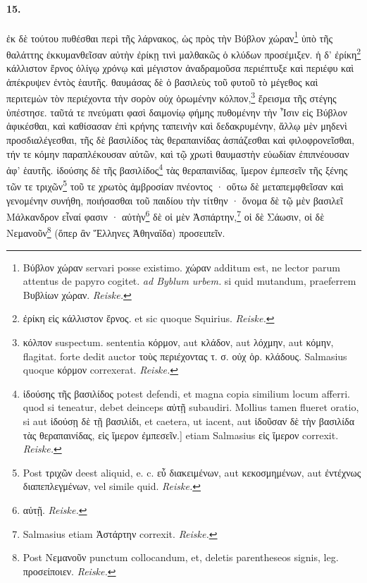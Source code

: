 \documentclass[a4paper, 11pt, oneside, polutonikogreek, german]{article}
\begin{document}
\paragraph{15.}
ἐκ δὲ τούτου πυθέσθαι περὶ τῆς λάρνακος, ὡς πρὸς τὴν Βύβλον χώραν\footnote{Βύβλον χώραν servari posse existimo. χώραν additum est, ne lector parum attentus de papyro cogitet. \emph{ad Byblum urbem.} si quid mutandum, praeferrem Βυβλίων χώραν. \emph{Reiske.}} ὑπὸ τῆς θαλάττης ἐκκυμανθεῖσαν αὐτὴν ἐρίκῃ τινὶ μαλθακῶς ὁ κλύδων προσέμιξεν. ἡ δ' ἐρίκη\footnote{ἐρίκη εἰς κάλλιστον ἔρνος. et sic quoque Squirius. \emph{Reiske.}} κάλλιστον ἔρνος ὀλίγῳ χρόνῳ καὶ μέγιστον ἀναδραμοῦσα περιέπτυξε καὶ περιέφυ καὶ ἀπέκρυψεν ἐντὸς ἑαυτῆς. θαυμάσας δὲ ὁ βασιλεὺς τοῦ φυτοῦ τὸ μέγεθος καὶ περιτεμὼν τὸν περιέχοντα τὴν σορὸν οὐχ ὁρωμένην κόλπον,\footnote{κόλπον suspectum. sententia κόρμον, aut κλάδον, aut λόχμην, aut κόμην, flagitat. forte dedit auctor τοὺς περιέχοντας τ. σ. οὐχ ὁρ. κλάδους. Salmasius quoque κόρμον correxerat. \emph{Reiske.}} ἔρεισμα τῆς στέγης ὑπέστησε. ταῦτά τε πνεύματι φασὶ δαιμονίῳ φήμης πυθομένην τὴν Ἶσιν εἰς Βύβλον ἀφικέσθαι, καὶ καθίσασαν ἐπὶ κρήνης ταπεινὴν καὶ δεδακρυμένην, ἄλλῳ μὲν μηδενὶ προσδιαλέγεσθαι, τῆς δὲ βασιλίδος τὰς θεραπαινίδας ἀσπάζεσθαι καὶ φιλοφρονεῖσθαι, τήν τε κόμην παραπλέκουσαν αὐτῶν, καὶ τῷ χρωτὶ θαυμαστὴν εὐωδίαν ἐπιπνέουσαν ἀφ' ἑαυτῆς. ἰδούσης δὲ τῆς βασιλίδος\footnote{ἰδούσης τῆς βασιλίδος potest defendi, et magna copia similium locum afferri. quod si teneatur, debet deinceps αὐτῇ subaudiri. Mollius tamen flueret oratio, si aut ἰδούσῃ δὲ τῇ βασιλίδι, et caetera, ut iacent, aut ἰδοῦσαν δὲ τὴν βασιλίδα τὰς θεραπαινίδας, εἰς ἵμερον ἐμπεσεῖν.] etiam Salmasius εἰς ἵμερον correxit. \emph{Reiske.}} τὰς θεραπαινίδας, ἵμερον ἐμπεσεῖν τῆς ξένης τῶν τε τριχῶν\footnote{Post τριχῶν deest aliquid, e. c. εὖ διακειμένων, aut κεκοσμημένων, aut ἐντέχνως διαπεπλεγμένων, vel simile quid. \emph{Reiske.}} τοῦ τε χρωτὸς ἀμβροσίαν πνέοντος · οὕτω δὲ μεταπεμφθεῖσαν καὶ γενομένην συνήθη, ποιήσασθαι τοῦ παιδίου τὴν τίτθην · ὄνομα δὲ τῷ μὲν βασιλεῖ Μάλκανδρον εἶναί φασιν · αὐτὴν\footnote{αὐτῇ. \emph{Reiske.}} δὲ οἱ μὲν Ἀσπάρτην,\footnote{Salmasius etiam Ἀστάρτην correxit. \emph{Reiske.}} οἱ δὲ Σάωσιν, οἱ δὲ Νεμανοῦν\footnote{Post Νεμανοῦν punctum collocandum, et, deletis parentheseos signis, leg. προσείποιεν. \emph{Reiske.}} (ὅπερ ἂν Ἕλληνες Ἀθηναΐδα) προσειπεῖν.
\end{document}
